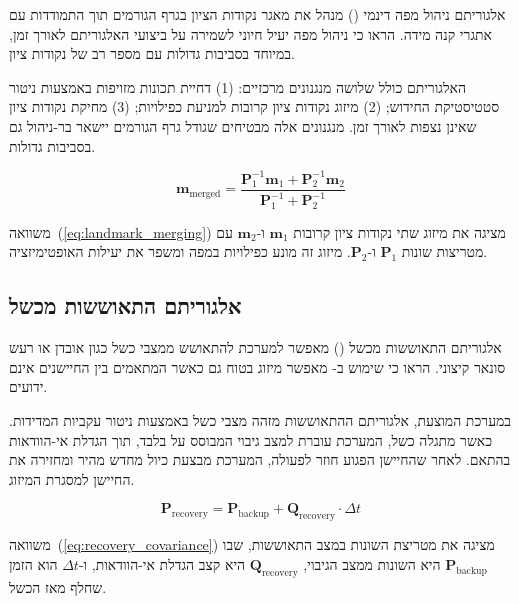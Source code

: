 אלגוריתם ניהול מפה דינמי () מנהל את מאגר נקודות הציון בגרף הגורמים תוך התמודדות עם אתגרי קנה מידה. \citet{Kaess2012} הראו כי ניהול מפה יעיל חיוני לשמירה על ביצועי האלגוריתם לאורך זמן, במיוחד בסביבות גדולות עם מספר רב של נקודות ציון.

האלגוריתם כולל שלושה מנגנונים מרכזיים: (1) דחיית תכונות מזויפות באמצעות ניטור סטטיסטיקת החידוש; (2) מיזוג נקודות ציון קרובות למניעת כפילויות; (3) מחיקת נקודות ציון שאינן נצפות לאורך זמן. מנגנונים אלה מבטיחים שגודל גרף הגורמים יישאר בר-ניהול גם בסביבות גדולות.

\begin{equation}
\mathbf{m}_{\text{merged}} = \frac{\mathbf{P}_1^{-1} \mathbf{m}_1 + \mathbf{P}_2^{-1} \mathbf{m}_2}{\mathbf{P}_1^{-1} + \mathbf{P}_2^{-1}}
\label{eq:landmark_merging}
\end{equation}

משוואה~(\ref{eq:landmark_merging}) מציגה את מיזוג שתי נקודות ציון קרובות $\mathbf{m}_1$ ו-$\mathbf{m}_2$ עם מטריצות שונות $\mathbf{P}_1$ ו-$\mathbf{P}_2$. מיזוג זה מונע כפילויות במפה ומשפר את יעילות האופטימיזציה.

\subsection{אלגוריתם התאוששות מכשל}
\label{sec:failure_recovery}

אלגוריתם התאוששות מכשל () מאפשר למערכת להתאושש ממצבי כשל כגון אובדן  או רעש סונאר קיצוני. \citet{Julier1997CovarianceIntersection} הראו כי שימוש ב- מאפשר מיזוג בטוח גם כאשר המתאמים בין החיישנים אינם ידועים.

במערכת המוצעת, אלגוריתם ההתאוששות מזהה מצבי כשל באמצעות ניטור עקביות המדידות. כאשר מתגלה כשל, המערכת עוברת למצב גיבוי המבוסס על  בלבד, תוך הגדלת אי-הוודאות בהתאם. לאחר שהחיישן הפגוע חוזר לפעולה, המערכת מבצעת כיול מחדש מהיר ומחזירה את החיישן למסגרת המיזוג.

\begin{equation}
\mathbf{P}_{\text{recovery}} = \mathbf{P}_{\text{backup}} + \mathbf{Q}_{\text{recovery}} \cdot \Delta t
\label{eq:recovery_covariance}
\end{equation}

משוואה~(\ref{eq:recovery_covariance}) מציגה את מטריצת השונות במצב התאוששות, שבו $\mathbf{P}_{\text{backup}}$ היא השונות ממצב הגיבוי, $\mathbf{Q}_{\text{recovery}}$ היא קצב הגדלת אי-הוודאות, ו-$\Delta t$ הוא הזמן שחלף מאז הכשל.

